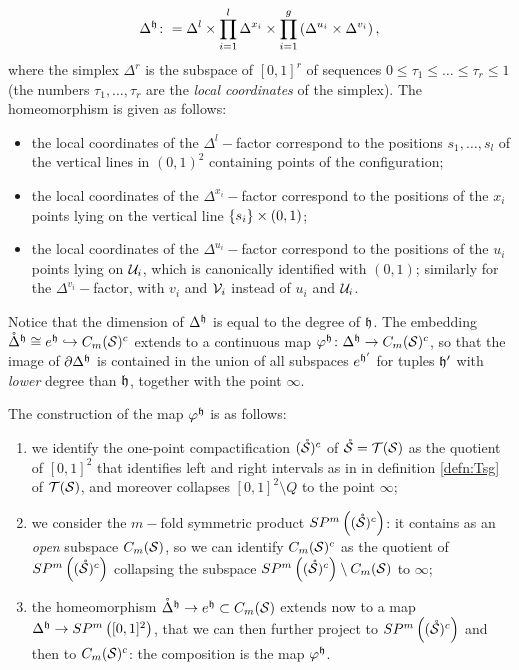 \[
 \Delta^{\mathfrak{h}}\colon =
 \Delta^l\times\prod_{i=1}^l\Delta^{x_i}\times\prod_{i=1}^g\left(\Delta^{u_i}\times\Delta^{v_i}\right),
\]
where the simplex $\Delta^r$ is the subspace of $[0,1]^r$ of sequences $0\leq \tau_1\leq\dots\leq\tau_r\leq 1$
(the numbers $\tau_1,\dots,\tau_r$ are the \emph{local coordinates} of the simplex). The homeomorphism is given
as follows:
\begin{itemize}
 \item the local coordinates of the $\Delta^l-$factor correspond to the positions $s_1,\dots,s_l$ of the vertical
 lines in $(0,1)^2$ containing points of the configuration;
 \item the local coordinates of the $\Delta^{x_i}-$factor correspond to the positions of the $x_i$ points
 lying on the vertical line $\left\{s_i\right\}\times(0,1)$;
 \item the local coordinates of the $\Delta^{u_i}-$factor correspond to the positions of the $u_i$ points
 lying on $\mathcal{U}_i$, which is canonically identified with $(0,1)$; similarly for the $\Delta^{v_i}-$factor,
 with $v_i$ and $\mathcal{V}_i$ instead of $u_i$ and $\mathcal{U}_i$.
\end{itemize}
Notice that the dimension of $\Delta^{\mathfrak{h}}$ is equal to the degree of $\mathfrak{h}$.
The embedding $\mathring{\Delta}^{\mathfrak{h}}\cong e^{\mathfrak{h}}\hookrightarrow C_m(\mathcal{S})^c$ extends to a continuous map
$\varphi^{\mathfrak{h}}\colon\Delta^{\mathfrak{h}}\to C_m(\mathcal{S})^c$, so that the image of $\partial\Delta^{\mathfrak{h}}$ is contained in the union of
all subspaces $e^{\mathfrak{h}'}$ for tuples $\mathfrak{h}'$ with \emph{lower} degree than $\mathfrak{h}$, together with the point $\infty$.

The construction of the map $\varphi^{\mathfrak{h}}$ is as follows:
\begin{enumerate}
\item we identify the one-point compactification
$(\mathring{\mathcal{S}})^c$ of $\mathring{\mathcal{S}}=\mathcal{T}(\mathcal{S})$ as the quotient of $[0,1]^2$ that identifies left and right intervals as in
in definition \ref{defn:Tsg} of $\mathcal{T}(\mathcal{S})$, and moreover collapses $[0,1]^2\setminus Q$ to the point $\infty$;
\item we consider the $m-$fold symmetric product $SP^m\left((\mathring{\mathcal{S}})^c\right)$: it contains 
as an \emph{open} subspace $C_m(\mathcal{S})$, so we can identify $C_m(\mathcal{S})^c$ as the quotient of $SP^m\left((\mathring{\mathcal{S}})^c\right)$ collapsing
the subspace $SP^m\left((\mathring{\mathcal{S}})^c\right)\setminus C_m(\mathcal{S})$ to $\infty$;
\item the homeomorphism $\mathring{\Delta}^{\mathfrak{h}}\to e^{\mathfrak{h}}\subset C_m(\mathcal{S})$ extends
now to a map $\Delta^{\mathfrak{h}}\to SP^m\left([0,1]^2\right)$, that we can then further project to
$ SP^m\left((\mathring{\mathcal{S}})^c\right)$ and then to $C_m(\mathcal{S})^c$: the composition
is the map $\varphi^{\mathfrak{h}}$.
\end{enumerate}

